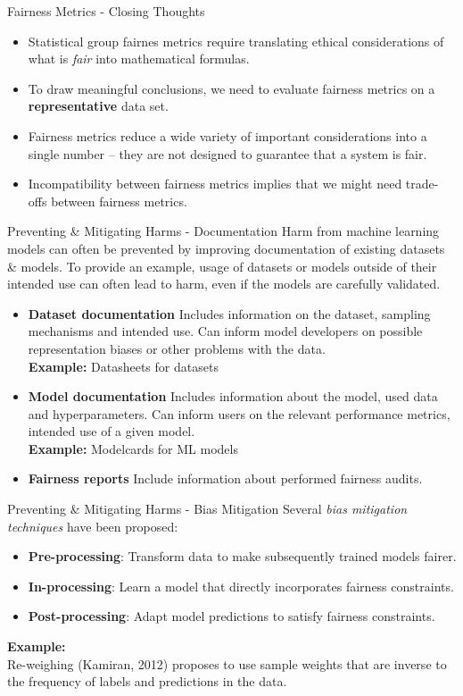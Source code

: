 \documentclass[11pt,compress,t,notes=noshow, xcolor=table]{beamer}
\begin{document}
\begin{vbframe}{Fairness Metrics - Closing Thoughts}
  \begin{itemize}
    \item Statistical group fairnes metrics require translating ethical considerations of what is \emph{fair} into mathematical formulas.
    \item To draw meaningful conclusions, we need to evaluate fairness metrics on a \textbf{representative} data set. 
    \item Fairness metrics reduce a wide variety of important considerations into a single number -- they are not designed to guarantee that a system is fair.
    \item Incompatibility between fairness metrics implies that we might need trade-offs between fairness metrics.
  \end{itemize}
\end{vbframe}

\begin{vbframe}{Preventing \& Mitigating Harms - Documentation}
    Harm from machine learning models can often be prevented by improving documentation of existing datasets \& models.
    To provide an example, usage of datasets or models outside of their intended use can often lead to harm, even if the models are carefully validated.
    \begin{itemize}
      \item \textbf{Dataset documentation} Includes information on the dataset, sampling mechanisms and intended use.
      Can inform model developers on possible representation biases or other problems with the data. \\
      \textbf{Example:} Datasheets for datasets
      \item \textbf{Model documentation} Includes information about the model, used data and hyperparameters. 
      Can inform users on the relevant performance metrics, intended use of a given model. \\
      \textbf{Example:} Modelcards for ML models
      \item \textbf{Fairness reports} Include information about performed fairness audits.
    \end{itemize}
\end{vbframe}

\begin{vbframe}{Preventing \& Mitigating Harms - Bias Mitigation}
  Several \emph{bias mitigation techniques} have been proposed:
  \begin{itemize}
    \item \textbf{Pre-processing}: Transform data to make subsequently trained models fairer.
    \item \textbf{In-processing}: Learn a model that directly incorporates fairness constraints.
    \item \textbf{Post-processing}: Adapt model predictions to satisfy fairness constraints.
  \end{itemize}
  \textbf{Example:}\\
  Re-weighing (Kamiran, 2012) proposes to use sample weights that are inverse to the frequency of labels and predictions in the data.
\end{vbframe}
\end{document}
